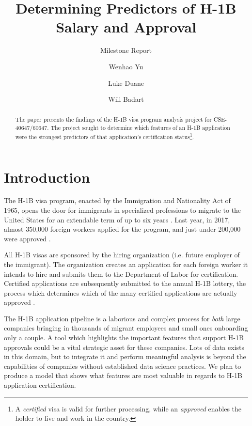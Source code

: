 \documentclass[sigconf]{acmart}
\begin{document}
\title{Determining Predictors of H-1B Salary and Approval}
\subtitle{Milestone Report}


\author{Wenhao Yu}

\author{Luke Duane}

\author{Will Badart}


\begin{abstract}
The paper presents the findings of the H-1B visa program analysis project for CSE-40647/60647.
The project sought to determine which features of an H-1B application were the strongest predictors
of that application's certification status\footnote{A {\it certified} visa is valid for further
processing, while an {\it approved} enables the holder to live and work in the country.}.
\end{abstract}

\maketitle


\section{Introduction}

The H-1B visa program, enacted by the Immigration and Nationality Act of 1965, opens the door for
immigrants in specialized professions to migrate to the United States for an extendable term of up to six
years \cite{FederalRegister}. Last year, in 2017, almost 350,000 foreign workers applied for the program,
and just under 200,000 were approved \cite{DHS}.

All H-1B visas are sponsored by the hiring organization (i.e. future employer of the immigrant).
The organization creates an application for each foreign worker it intends to hire and submits them to
the Department of Labor for certification.
Certified applications are subsequently submitted to the annual H-1B lottery, the process which
determines which of the many certified applications are actually approved \cite{USCIS}.

The H-1B application pipeline is a laborious and complex process for {\em both} large companies bringing
in thousands of migrant employees and small ones onboarding only a couple. A tool which
highlights the important features that support H-1B approvals could be a vital strategic asset for
these companies. Lots of data exists in this domain, but to integrate it and perform meaningful
analysis is beyond the capabilities of companies without established data science practices.
We plan to produce a model that shows what features are most valuable in regards to H-1B application
certification.
\end{document}
